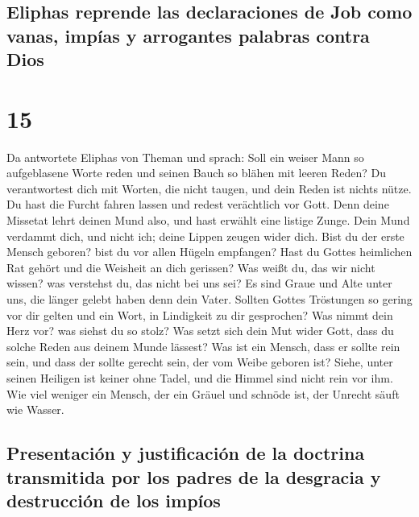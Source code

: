 \hypertarget{eliphas-reprende-las-declaraciones-de-job-como-vanas-impuxedas-y-arrogantes-palabras-contra-dios}{%
\subsection{Eliphas reprende las declaraciones de Job como vanas, impías
y arrogantes palabras contra
Dios}\label{eliphas-reprende-las-declaraciones-de-job-como-vanas-impuxedas-y-arrogantes-palabras-contra-dios}}

\hypertarget{section-14}{%
\section{15}\label{section-14}}

 Da antwortete Eliphas von Theman und sprach:
 Soll ein weiser Mann so aufgeblasene Worte reden und
seinen Bauch so blähen mit leeren Reden?  Du verantwortest
dich mit Worten, die nicht taugen, und dein Reden ist nichts nütze.
 Du hast die Furcht fahren lassen und redest verächtlich
vor Gott.  Denn deine Missetat lehrt deinen Mund also, und
hast erwählt eine listige Zunge.  Dein Mund verdammt dich,
und nicht ich; deine Lippen zeugen wider dich.  Bist du
der erste Mensch geboren? bist du vor allen Hügeln empfangen?
 Hast du Gottes heimlichen Rat gehört und die Weisheit an
dich gerissen?  Was weißt du, das wir nicht wissen? was
verstehst du, das nicht bei uns sei?  Es sind Graue und
Alte unter uns, die länger gelebt haben denn dein Vater. 
Sollten Gottes Tröstungen so gering vor dir gelten und ein Wort, in
Lindigkeit zu dir gesprochen?  Was nimmt dein Herz vor?
was siehst du so stolz?  Was setzt sich dein Mut wider
Gott, dass du solche Reden aus deinem Munde lässest?  Was
ist ein Mensch, dass er sollte rein sein, und dass der sollte gerecht
sein, der vom Weibe geboren ist?  Siehe, unter seinen
Heiligen ist keiner ohne Tadel, und die Himmel sind nicht rein vor ihm.
 Wie viel weniger ein Mensch, der ein Gräuel und schnöde
ist, der Unrecht säuft wie Wasser.

\hypertarget{presentaciuxf3n-y-justificaciuxf3n-de-la-doctrina-transmitida-por-los-padres-de-la-desgracia-y-destrucciuxf3n-de-los-impuxedos}{%
\subsection{Presentación y justificación de la doctrina transmitida por
los padres de la desgracia y destrucción de los
impíos}\label{presentaciuxf3n-y-justificaciuxf3n-de-la-doctrina-transmitida-por-los-padres-de-la-desgracia-y-destrucciuxf3n-de-los-impuxedos}}

